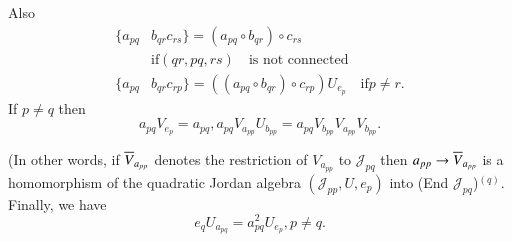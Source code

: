 Also
\begin{align*}
\{a_{pq}&b_{qr}c_{rs}\}=(a_{pq}\circ b_{qr})\circ c_{rs}\\
&\text{if}(qr, pq, rs)\quad\text{is not connected}\tag*{PD 4}\\
\{a_{pq}&b_{qr}c_{rp}\}=((a_{pq}\circ b_{qr})\circ
c_{rp})U_{e_{p}}\quad \text{if}p\neq r.
\end{align*}
If $p\neq q$ then
\begin{equation*}
  a_{pq}V_{e_{p}} = a_{pq},a_{pq}V_{a_{pp}}U_{b_{pp}}= a_{pq}
  V_{b_{pp}} V_{a_{pp}}V_{b_{pp}}.\tag*{PD 5}
\end{equation*}

(In other words, if $\overline{V}_{a_{pp}}$ denotes the restriction of
$V_{a_{pp}}$ to $\mathscr{J}_{pq}$ then $a_{pp}\to \overline{V}_{a_{pp}}$ is
a homomorphism of the quadratic Jordan algebra \break $(\mathscr{J}_{pp},U,e_p)$
into (End $\mathscr{J}_{pq}$)$^{(q)}$. Finally, we have
\begin{equation*}
e_qU_{a_{pq}}=a^{2}_{pq}U_{e_p},p\neq q\tag*{PD 6}.
\end{equation*}

